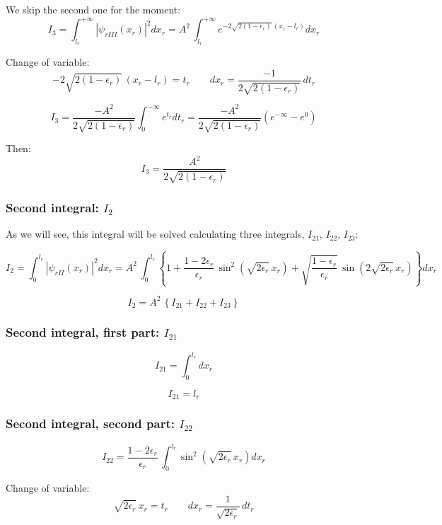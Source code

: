 We skip the second one for the moment:
\[
I_3 = \int_{l_r}^{+\infty}\left|\psi_{rIII}(x_r)\right|^2 dx_r 
= 
A^2\,\int_{l_r}^{+\infty} e^{-2\sqrt{2(1-\epsilon_r)}\,(x_r-l_r)} dx_r
\]

Change of variable:
\[
-2\sqrt{2(1-\epsilon_r)}\,(x_r-l_r) = t_r
\hspace{2em}
dx_r = \frac{-1}{2\sqrt{2(1-\epsilon_r)}}\,dt_r
\]

\[
I_3
= \frac{-A^2}{2\sqrt{2(1-\epsilon_r)}}\int_{0}^{-\infty} e^{t_r} dt_r
= \frac{-A^2}{2\sqrt{2(1-\epsilon_r)}}(e^{-\infty}-e^{0})
\]

Then:
\begin{equation}
\label{I3}
I_3 = \frac{A^2}{2\sqrt{2(1-\epsilon_r)}}
\end{equation}

\subsubsection{Second integral: $I_2$}

As we will see, this integral will be solved calculating three integrals,
$I_21$, $I_22$, $I_23$:

\[
I_2 = \int_{0}^{l_r}\left|\psi_{rII}(x_r)\right|^2 dx_r 
= 
A^2\,\int_{0}^{l_r}
\left\lbrace
1
 + \frac{1-2\epsilon_r}{\epsilon_r}\,\sin^2\left(\sqrt{2\epsilon_r}\,x_r\right)
 + \sqrt{\frac{1-\epsilon_r}{\epsilon_r}}\,\sin\left(2\sqrt{2\epsilon_r}\,x_r\right)
\right\rbrace
dx_r
\]

\[
I_2 = A^2\,\left\lbrace I_{21} + I_{22} + I_{23}\right\rbrace
\]

\subsubsection{Second integral, first part: $I_{21}$}

\[
I_{21}
= 
\int_{0}^{l_r} dx_r
\]

\begin{equation}
\label{I21}
I_{21} = l_r
\end{equation}

\subsubsection{Second integral, second part: $I_{22}$}

\[
I_{22}
= 
\frac{1-2\epsilon_r}{\epsilon_r}\,
\int_{0}^{l_r}\sin^2\left(\sqrt{2\epsilon_r}\,x_r\right) dx_r
\]

Change of variable:
\[
\sqrt{2\epsilon_r}\,x_r = t_r
\hspace{2em}
dx_r = \frac{1}{\sqrt{2\epsilon_r}}\,dt_r
\]

